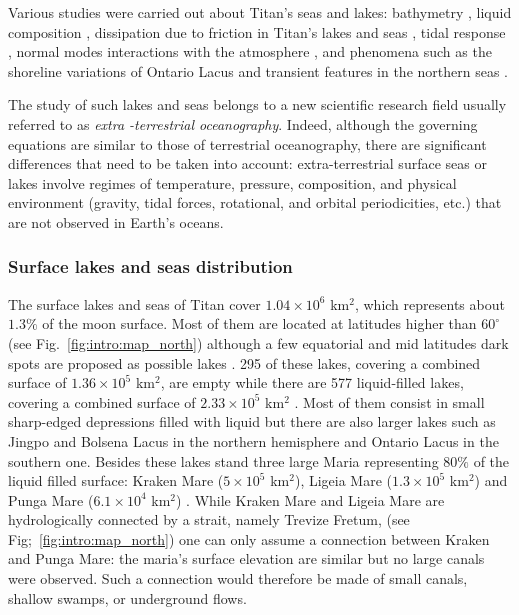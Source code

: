 Various studies were carried out about Titan's seas and lakes: bathymetry \citep[e.g.][]{hayes2010bathymetry, ventura2012electromagnetic, mastrogiuseppe2014bathymetry,mastrogiuseppe2018cassini,mastrogiuseppe2018bathymetry,lorenz2014radar, hayes2016lakes,hayes2017topographic}, liquid composition \citep[e.g.][]{brown2008identification, cordier2009estimate, glein2013geochemical, tan2013titan, tan2015titan, luspay2015experimental}, dissipation due to friction in Titan's lakes and seas \citep[e.g.][]{sagan1982tide, dermott1995tidal, sears1995tidal, lorenz2014radar}, tidal response \citep{tokano2010simulation, tokano2014numerical,vincent2016numerical,vincent2018numerical}, normal modes \citep{dermott1995tidal,tokano2010simulation,vincent2019normal} interactions with the atmosphere \citep{tokano2015wind, tokano2015sun}, and phenomena such as the shoreline variations of Ontario Lacus \citep{turtle2011shoreline,hayes2011transient} and transient features in the northern seas \citep{hofgartner2014transient, hofgartner2016titan}. 

 The study of such lakes and seas belongs to a new scientific research field usually referred to as \textit{extra -terrestrial oceanography}. Indeed, although the governing equations are similar to those of terrestrial oceanography, there are significant differences that need to be taken into account: extra-terrestrial surface seas or lakes involve regimes of temperature, pressure, composition, and physical environment (gravity, tidal forces, rotational, and orbital periodicities, etc.) that are not observed in Earth's oceans.

\subsubsection{Surface lakes and seas distribution}
The surface lakes and seas of Titan cover $1.04\times 10^6$ km$^2$, which represents about $1.3\%$ of the moon surface. Most of them are located at latitudes higher than $60^\circ$ \citep{aharonson2009asymmetric} (see Fig.~\ref{fig:intro:map_north}) although a few equatorial and mid latitudes dark spots are proposed as possible lakes \citep{griffith2012possible}. 295 of these lakes, covering a combined surface of $1.36\times 10^5$ km$^2$, are empty while there are 577 liquid-filled lakes, covering a combined surface of $2.33\times 10^5$ km$^2$ \citep{hayes2016lakes}. Most of them consist in small sharp-edged depressions filled with liquid but there are also larger lakes such as Jingpo and Bolsena Lacus in the northern hemisphere and Ontario Lacus in the southern one. Besides these lakes stand three large Maria representing $80\%$ of the liquid filled surface: Kraken Mare ($5\times 10^5$ km$^2$), Ligeia Mare ($1.3\times 10^5$ km$^2$) and Punga Mare ($6.1\times 10^4$ km$^2$) \citep{hayes2016lakes}. While Kraken Mare and Ligeia Mare are hydrologically connected by a strait, namely Trevize Fretum, \citep{sotin2012observations} (see Fig;~\ref{fig:intro:map_north}) one can only assume a connection between Kraken and Punga Mare: the maria's surface elevation are similar \citep{hayes2017topographic,hayes2016lakes} but no large canals were observed. Such a connection would therefore be made of small canals, shallow swamps, or underground flows. 



